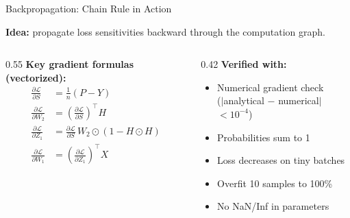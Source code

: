 \documentclass[11pt,aspectratio=169]{beamer}
\begin{document}
\begin{frame}{Backpropagation: Chain Rule in Action}

\textbf{Idea:} propagate loss sensitivities backward through the computation graph.

\vspace{0.3em}
\begin{columns}[T]
\begin{column}{0.55\textwidth}
\textbf{Key gradient formulas (vectorized):}
\begin{align*}
\frac{\partial \mathcal{L}}{\partial S} &= \tfrac{1}{n}(P - Y) \\[4pt]
\frac{\partial \mathcal{L}}{\partial W_2} &= \left(\tfrac{\partial \mathcal{L}}{\partial S}\right)^\top H \\[4pt]
\frac{\partial \mathcal{L}}{\partial Z_1} &= \tfrac{\partial \mathcal{L}}{\partial S}\, W_2 \odot (1 - H \odot H) \\[4pt]
\frac{\partial \mathcal{L}}{\partial W_1} &= \left(\tfrac{\partial \mathcal{L}}{\partial Z_1}\right)^\top X
\end{align*}
\end{column}
\begin{column}{0.42\textwidth}
\textbf{Verified with:}
\begin{itemize}
    \item Numerical gradient check\\($|$analytical $-$ numerical$|$ $< 10^{-4}$)
    \item Probabilities sum to 1
    \item Loss decreases on tiny batches
    \item Overfit 10 samples to 100\%
    \item No NaN/Inf in parameters
\end{itemize}
\end{column}
\end{columns}

\end{frame}
\end{document}
